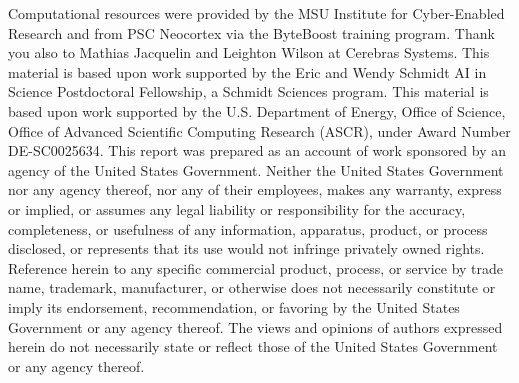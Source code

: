 \begin{acknowledgement}
Computational resources were provided by the MSU Institute for Cyber-Enabled Research and from PSC Neocortex via the ByteBoost training program.
Thank you also to Mathias Jacquelin and Leighton Wilson at Cerebras Systems.
This material is based upon work supported by the Eric and Wendy Schmidt AI in Science Postdoctoral Fellowship, a Schmidt Sciences program.
This material is based upon work supported by the U.S. Department of Energy, Office of Science, Office of Advanced Scientific Computing Research (ASCR), under Award Number DE-SC0025634.
This report was prepared as an account of work sponsored by an agency of the United States Government.
Neither the United States Government nor any agency thereof, nor any of their employees, makes any warranty, express or implied, or assumes any legal liability or responsibility for the accuracy, completeness, or usefulness of any information, apparatus, product, or process disclosed, or represents that its use would not infringe privately owned rights.
Reference herein to any specific commercial product, process, or service by trade name, trademark, manufacturer, or otherwise does not necessarily constitute or imply its endorsement, recommendation, or favoring by the United States Government or any agency thereof.
The views and opinions of authors expressed herein do not necessarily state or reflect those of the United States Government or any agency thereof.
\end{acknowledgement}

